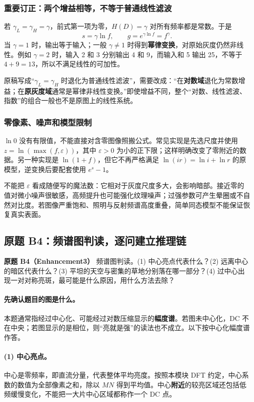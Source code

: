 \subsubsection{重要订正：两个增益相等，不等于普通线性滤波}
若 $\gamma_L=\gamma_H=\gamma$，前式第一项为零，$H(D)=\gamma$ 对所有频率都是常数。于是
\[
s=\gamma\ln f,\qquad g=e^{\gamma\ln f}=f^\gamma.
\]
当 $\gamma=1$ 时，输出等于输入；一般 $\gamma\neq1$ 时得到\textbf{幂律变换}，对原始灰度仍然非线性。例如 $\gamma=2$ 时，输入 2 和 3 分别输出 4 和 9，而输入和 5 输出 25，不等于 $4+9=13$，所以不满足线性的可加性。

原稿写成“$\gamma_L=\gamma_H$ 时退化为普通线性滤波”，需要改成：“在\textbf{对数域}退化为常数增益；在\textbf{原灰度域}通常是幂律非线性变换。”即使增益不同，整个“对数、线性滤波、指数”的组合一般也不是原图上的线性系统。

\subsubsection{零像素、噪声和模型限制}
$\ln0$ 没有有限值，不能直接对含零图像照搬公式。常见实现是先选尺度并使用 $z=\ln(\max(f,\varepsilon))$，其中 $\varepsilon>0$ 为小的正下限；这样明确改变了零附近的数据。另一种实现是 $\ln(1+f)$，但它不再严格满足 $\ln(ir)=\ln i+\ln r$ 的原模型，逆变换后要配套使用 $e^s-1$。

不能把 $\varepsilon$ 看成随便写的魔法数：它相对于灰度尺度多大，会影响暗部。接近零的值对微小噪声很敏感，高频提升也可能强化纹理噪声；过强参数可产生晕圈或不自然对比度。若图像严重饱和、照明与反射频谱高度重叠，简单同态模型不能保证恢复真实表面。

\subsection{原题 B4：频谱图判读，逐问建立推理链}
\label{original:B4}

\noindent\textbf{原题 B4（Enhancement3）}\quad
频谱图判读。(1) 中心亮点代表什么？(2) 远离中心的暗区代表什么？(3) 平坦的天空与密集的草地分别落在哪一部分？(4) 过中心出现一对对称亮斑，最可能是什么原因，用什么方法去除？

\paragraph{先确认题目的图是什么。}
本题通常指经过中心化、可能经过对数压缩显示的\textbf{幅度谱}。若图未中心化，DC 不在中央；若图显示的是相位，则“亮就是强”的读法也不成立。以下按中心化幅度谱作答。

\paragraph{(1) 中心亮点。}
中心是零频率，即直流分量，代表整体平均亮度。按照本模块 DFT 约定，中心系数的数值为全部像素之和，除以 $MN$ 得到平均值。中心\textbf{附近}的较亮区域还包括低频缓慢变化，不能把一大片中心区域都称作一个 DC 点。

